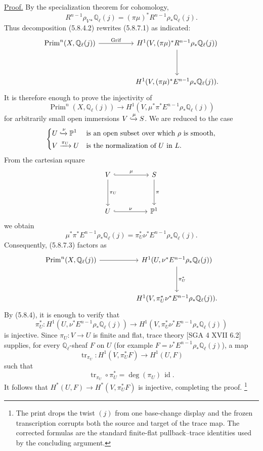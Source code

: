 \underline{Proof.}
By the specialization theorem for cohomology,
\[
R^{n-1}\rho_{V*}\mathbb Q_\ell(j)
=(\pi\mu)^*R^{n-1}\rho_*\mathbb Q_\ell(j).
\]
Thus decomposition (5.8.4.2) rewrites (5.8.7.1) as indicated:
\[
\begin{tikzcd}[column sep=huge,row sep=huge]
\operatorname{Prim}^n(X,\mathbb Q_\ell(j))
  \arrow[r,"\operatorname{Grif}"]
& H^1(V,(\pi\mu)^*R^{n-1}\rho_*\mathbb Q_\ell(j)) \arrow[d] \\
{}
& H^1(V,(\pi\mu)^*E^{n-1}\rho_*\mathbb Q_\ell(j)).
\end{tikzcd}
\]
It is therefore enough to prove the injectivity of
\begin{equation}\tag{5.8.7.3}
\operatorname{Prim}^n(X,\mathbb Q_\ell(j))
\longrightarrow
H^1(V,\mu^*\pi^*E^{n-1}\rho_*\mathbb Q_\ell(j))
\end{equation}
for arbitrarily small open immersions $V\xhookrightarrow{\mu}S$.  We are
reduced to the case
\[
\left\{
\begin{aligned}
U&\xhookrightarrow{\nu}\mathbb P^1
   &&\text{is an open subset over which $\rho$ is smooth},\\
V&\xrightarrow{\pi_U}U
   &&\text{is the normalization of $U$ in $L$}.
\end{aligned}
\right.
\]
From the cartesian square
\[
\begin{tikzcd}[column sep=huge,row sep=huge]
V\arrow[r,hook,"\mu"]\arrow[d,"\pi_U"]
&S\arrow[d,"\pi"]\\
U\arrow[r,hook,"\nu"]
&\mathbb P^1
\end{tikzcd}
\]
we obtain
\[
\mu^*\pi^*E^{n-1}\rho_*\mathbb Q_\ell(j)
=\pi_U^*\nu^*E^{n-1}\rho_*\mathbb Q_\ell(j).
\]
Consequently, (5.8.7.3) factors as
\[
\begin{tikzcd}[column sep=huge,row sep=huge]
\operatorname{Prim}^n(X,\mathbb Q_\ell(j)) \arrow[r]
&H^1(U,\nu^*E^{n-1}\rho_*\mathbb Q_\ell(j))
  \arrow[d,"\pi_U^*"] \\
{}
&H^1(V,\pi_U^*\nu^*E^{n-1}\rho_*\mathbb Q_\ell(j)).
\end{tikzcd}
\]
By (5.8.4), it is enough to verify that
\[
\pi_U^*:H^1(U,\nu^*E^{n-1}\rho_*\mathbb Q_\ell(j))
\longrightarrow
H^1(V,\pi_U^*\nu^*E^{n-1}\rho_*\mathbb Q_\ell(j))
\]
is injective.  Since $\pi_U:V\to U$ is finite and flat, trace theory
[SGA 4 XVII 6.2] supplies, for every $\mathbb Q_\ell$-sheaf $F$ on $U$
(for example $F=\nu^*E^{n-1}\rho_*\mathbb Q_\ell(j)$), a map
\[
\operatorname{tr}_{\pi_U}:H^1(V,\pi_U^*F)\longrightarrow H^1(U,F)
\]
such that
\[
\operatorname{tr}_{\pi_U}\circ\pi_U^*
=\deg(\pi_U)\,\operatorname{id}.
\]
It follows that $H^*(U,F)\to H^*(V,\pi_U^*F)$ is injective, completing
the proof.
\footnote{The print drops the twist $(j)$ from one base-change display and
the frozen transcription corrupts both the source and target of the trace
map.  The corrected formulas are the standard finite-flat pullback--trace
identities used by the concluding argument.}
